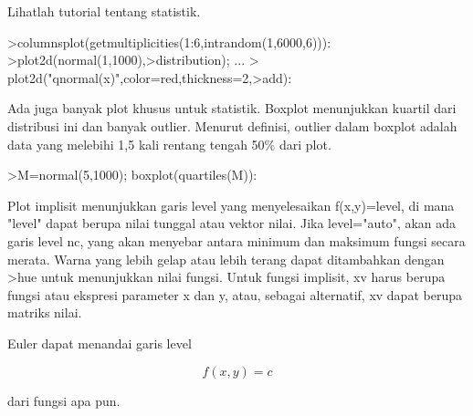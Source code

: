 \documentclass[a4paper,10pt]{article}
\begin{document}
\begin{eulernotebook}
\begin{eulercomment}
\begin{eulercomment}
\begin{eulercomment}
\begin{eulercomment}
\begin{eulercomment}
\begin{eulercomment}
\begin{eulercomment}
\begin{eulercomment}
\begin{eulercomment}
\begin{eulercomment}
\begin{eulercomment}
\begin{eulercomment}
\begin{eulercomment}
Lihatlah tutorial tentang statistik.
\end{eulercomment}
\begin{eulerprompt}
>columnsplot(getmultiplicities(1:6,intrandom(1,6000,6))):
>plot2d(normal(1,1000),>distribution); ...
>  plot2d("qnormal(x)",color=red,thickness=2,>add):
\end{eulerprompt}
\begin{eulercomment}
Ada juga banyak plot khusus untuk statistik. Boxplot menunjukkan
kuartil dari distribusi ini dan banyak outlier. Menurut definisi,
outlier dalam boxplot adalah data yang melebihi 1,5 kali rentang
tengah 50\% dari plot.
\end{eulercomment}
\begin{eulerprompt}
>M=normal(5,1000); boxplot(quartiles(M)):
\end{eulerprompt}
\begin{eulercomment}
Plot implisit menunjukkan garis level yang menyelesaikan f(x,y)=level,
di mana "level" dapat berupa nilai tunggal atau vektor nilai. Jika
level="auto", akan ada garis level nc, yang akan menyebar antara
minimum dan maksimum fungsi secara merata. Warna yang lebih gelap atau
lebih terang dapat ditambahkan dengan \textgreater{}hue untuk menunjukkan nilai
fungsi. Untuk fungsi implisit, xv harus berupa fungsi atau ekspresi
parameter x dan y, atau, sebagai alternatif, xv dapat berupa matriks
nilai.

Euler dapat menandai garis level

\end{eulercomment}
\begin{eulerformula}
\[
f(x,y) = c
\]
\end{eulerformula}
\begin{eulercomment}
dari fungsi apa pun.


\end{eulercomment}
\end{eulercomment}
\end{eulercomment}
\end{eulercomment}
\end{eulercomment}
\end{eulercomment}
\end{eulercomment}
\end{eulercomment}
\end{eulercomment}
\end{eulercomment}
\end{eulercomment}
\end{eulercomment}
\end{eulercomment}
\end{eulernotebook}
\end{document}

